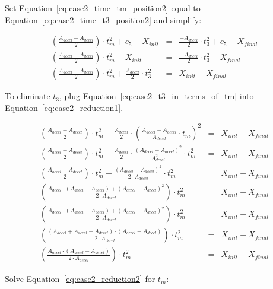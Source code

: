 \documentclass[11pt]{article} %
\begin{document}
\noindent Set Equation~\ref{eq:case2_time_tm_position2} equal to Equation~\ref{eq:case2_time_t3_position2} and simplify:

\begin{eqnarray}
 \left( \frac{A_{accel} - A_{decel}}{2} \right)  \cdot t_m^2 + c_5 - X_{init} & = &  \frac{-A_{decel}}{2}  \cdot t_3^2 + c_5 - X_{final} \nonumber \\
 \left( \frac{A_{accel} - A_{decel}}{2} \right)  \cdot t_m^2 - X_{init} & = &  \frac{-A_{decel}}{2}  \cdot t_3^2 - X_{final} \nonumber\\
\left( \frac{A_{accel} - A_{decel}}{2} \right)  \cdot t_m^2  + \frac{A_{decel}}{2}  \cdot t_3^2 & = &  X_{init} - X_{final}  \label{eq:case2_reduction1}
\end{eqnarray}

\noindent To eliminate $t_3$, plug Equation~\ref{eq:case2_t3_in_terms_of_tm} into Equation~\ref{eq:case2_reduction1}.

\begin{eqnarray}
\left( \frac{A_{accel} - A_{decel}}{2} \right)  \cdot t_m^2  + \frac{A_{decel}}{2}  \cdot \left(\frac{A_{decel} - A_{accel}}{A_{decel}} \cdot t_m\right)^2 & = &  X_{init} - X_{final} \nonumber \\
\left( \frac{A_{accel} - A_{decel}}{2} \right)  \cdot t_m^2  + \frac{A_{decel}}{2}  \cdot \frac{(A_{decel} - A_{accel})^2}{A^2_{decel}} \cdot t^2_m & = &  X_{init} - X_{final}  \nonumber\\
\left( \frac{A_{accel} - A_{decel}}{2} \right)  \cdot t_m^2  +  \frac{(A_{decel} - A_{accel})^2}{2 \cdot A_{decel}} \cdot t^2_m & = &  X_{init} - X_{final} \nonumber \\
\left( \frac{A_{decel} \cdot (A_{accel} - A_{decel}) + (A_{decel} - A_{accel})^2}{2 \cdot A_{decel}} \right)  \cdot t_m^2  & = &  X_{init} - X_{final}  \nonumber\\
\left( \frac{A_{decel} \cdot (A_{accel} - A_{decel}) + (A_{accel} - A_{decel})^2}{2 \cdot A_{decel}} \right)  \cdot t_m^2  & = &  X_{init} - X_{final}  \nonumber\\
\left( \frac{(A_{decel} + A_{accel} - A_{decel}) \cdot (A_{accel} - A_{decel})}{2 \cdot A_{decel}} \right)  \cdot t_m^2  & = &  X_{init} - X_{final} \nonumber \\
\left( \frac{A_{accel} \cdot (A_{accel} - A_{decel})}{2 \cdot A_{decel}} \right)  \cdot t_m^2  & = &  X_{init} - X_{final} \label{eq:case2_reduction2}
\end{eqnarray}

\noindent Solve Equation~\ref{eq:case2_reduction2} for $t_m$:
\end{document}
